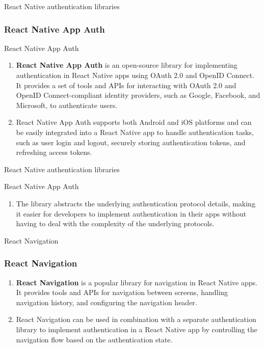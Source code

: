 \documentclass[10pt]{beamer}
\begin{document}
\begin{frame}{React Native authentication libraries}
\subsubsection{React Native App Auth}
\begin{block}{React Native App Auth}
\begin{enumerate}
\item[\ding{242}]\textbf{React Native App Auth} is an open-source library for implementing authentication in React Native apps using OAuth 2.0 and OpenID Connect. It provides a set of tools and APIs for interacting with OAuth 2.0 and OpenID Connect-compliant identity providers, such as Google, Facebook, and Microsoft, to authenticate users.
\item[\ding{242}]React Native App Auth supports both Android and iOS platforms and can be easily integrated into a React Native app to handle authentication tasks, such as user login and logout, securely storing authentication tokens, and refreshing access tokens.



\end{enumerate}
\end{block}
\end{frame}

\begin{frame}{React Native authentication libraries}
\begin{block}{React Native App Auth}
\begin{enumerate}
\item[\ding{242}]The library abstracts the underlying authentication protocol details, making it easier for developers to implement authentication in their apps without having to deal with the complexity of the underlying protocols.
\end{enumerate}
\end{block}
\begin{block}{React Navigation}
\subsubsection{React Navigation}
\begin{enumerate}
\item[\ding{242}]\textbf{React Navigation} is a popular library for navigation in React Native apps. It provides tools and APIs for navigation between screens, handling navigation history, and configuring the navigation header. 
\item[\ding{242}]React Navigation can be used in combination with a separate authentication library to implement authentication in a React Native app by controlling the navigation flow based on the authentication state.
\end{enumerate}

\end{block}
\end{frame}
\end{document}
